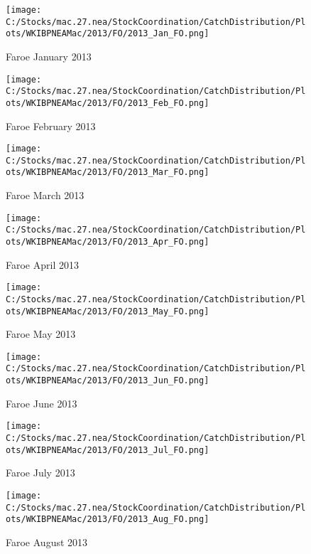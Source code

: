 \documentclass{article}
\begin{document}


\begin{figure}[h]
	\centering
		\texttt{[image: C:/Stocks/mac.27.nea/StockCoordination/CatchDistribution/Plots/WKIBPNEAMac/2013/FO/2013\_Jan\_FO.png]}
	\caption{Faroe January 2013}
	\label{fig:2013_Jan_FO}
\end{figure}

\begin{figure}
	\centering
		\texttt{[image: C:/Stocks/mac.27.nea/StockCoordination/CatchDistribution/Plots/WKIBPNEAMac/2013/FO/2013\_Feb\_FO.png]}
	\caption{Faroe February 2013}
	\label{fig:2013_Feb_FO}
\end{figure}

\begin{figure}
	\centering
		\texttt{[image: C:/Stocks/mac.27.nea/StockCoordination/CatchDistribution/Plots/WKIBPNEAMac/2013/FO/2013\_Mar\_FO.png]}
	\caption{Faroe March 2013}
	\label{fig:2013_Mar_FO}
\end{figure}

\begin{figure}
	\centering
		\texttt{[image: C:/Stocks/mac.27.nea/StockCoordination/CatchDistribution/Plots/WKIBPNEAMac/2013/FO/2013\_Apr\_FO.png]}
	\caption{Faroe April 2013}
	\label{fig:2013_Apr_FO}
\end{figure}

\begin{figure}
	\centering
		\texttt{[image: C:/Stocks/mac.27.nea/StockCoordination/CatchDistribution/Plots/WKIBPNEAMac/2013/FO/2013\_May\_FO.png]}
	\caption{Faroe May 2013}
	\label{fig:2013_May_FO}
\end{figure}

\begin{figure}
	\centering
		\texttt{[image: C:/Stocks/mac.27.nea/StockCoordination/CatchDistribution/Plots/WKIBPNEAMac/2013/FO/2013\_Jun\_FO.png]}
	\caption{Faroe June 2013}
	\label{fig:2013_Jun_FO}
\end{figure}

\begin{figure}
	\centering
		\texttt{[image: C:/Stocks/mac.27.nea/StockCoordination/CatchDistribution/Plots/WKIBPNEAMac/2013/FO/2013\_Jul\_FO.png]}
	\caption{Faroe July 2013}
	\label{fig:2013_Jul_FO}
\end{figure}

\begin{figure}
	\centering
		\texttt{[image: C:/Stocks/mac.27.nea/StockCoordination/CatchDistribution/Plots/WKIBPNEAMac/2013/FO/2013\_Aug\_FO.png]}
	\caption{Faroe August 2013}
	\label{fig:2013_Aug_FO}
\end{figure}
\end{document}
